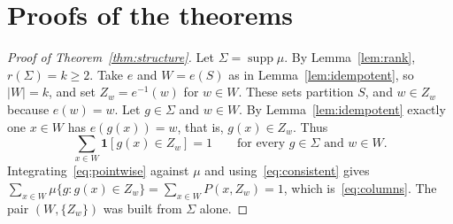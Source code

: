 \documentclass[11pt]{amsart}
\theoremstyle{remark}
\begin{document}
\section{Proofs of the theorems}\label{sec:proofs}

\begin{proof}[Proof of Theorem~\ref{thm:structure}]
Let $\Sigma=\operatorname{supp}\mu$. By Lemma~\ref{lem:rank}, $r(\Sigma)=k\ge2$. Take $e$ and $W=e(S)$ as in
Lemma~\ref{lem:idempotent}, so $|W|=k$, and set $Z_w=e^{-1}(w)$ for $w\in W$. These sets partition $S$, and $w\in Z_w$
because $e(w)=w$. Let $g\in\Sigma$ and $w\in W$. By Lemma~\ref{lem:idempotent} exactly one $x\in W$ has $e(g(x))=w$,
that is, $g(x)\in Z_w$. Thus
\begin{equation}\label{eq:pointwise}
\sum_{x\in W}\mathbf{1}[g(x)\in Z_w]=1\qquad\text{for every }g\in\Sigma\text{ and }w\in W.
\end{equation}
Integrating~\eqref{eq:pointwise} against $\mu$ and using~\eqref{eq:consistent} gives
$\sum_{x\in W}\mu\{g:g(x)\in Z_w\}=\sum_{x\in W}P(x,Z_w)=1$, which is~\eqref{eq:columns}. The pair $(W,\{Z_w\})$ was
built from $\Sigma$ alone.
\end{proof}
\end{document}
